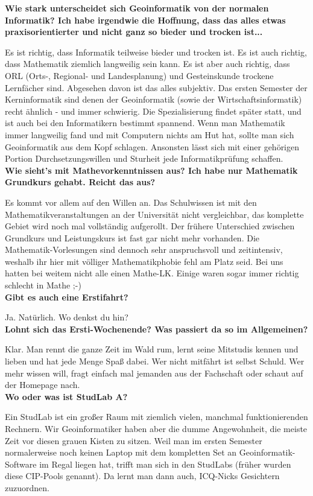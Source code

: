 \textbf{Wie stark unterscheidet sich Geoinformatik von der normalen Informatik? Ich habe irgendwie die Hoffnung, dass das alles etwas praxisorientierter und nicht ganz so bieder und trocken ist...}
 
Es ist richtig, dass Informatik teilweise bieder und trocken ist. Es ist auch richtig, dass Mathematik ziemlich langweilig sein kann. Es ist aber auch richtig, dass ORL (Orts-, Regional- und Landesplanung) und Gesteinskunde trockene Lernfächer sind. Abgesehen davon ist das alles subjektiv. Das ersten Semester der Kerninformatik sind denen der Geoinformatik (sowie der Wirtschaftsinformatik) recht ähnlich - und immer schwierig. Die Spezialisierung ﬁndet später statt, und ist auch bei den Informatikern bestimmt spannend. Wenn man Mathematik immer langweilig fand und mit Computern nichts am Hut hat, sollte man sich Geoinformatik aus dem Kopf schlagen. Ansonsten lässt sich mit einer gehörigen Portion Durchsetzungswillen und Sturheit jede Informatikprüfung schaffen.\\

\textbf{Wie sieht's mit Mathevorkenntnissen aus? Ich habe nur Mathematik Grundkurs gehabt. Reicht das aus?}

Es kommt vor allem auf den Willen an. Das Schulwissen ist mit den Mathematikveranstaltungen an der Universität nicht vergleichbar, das komplette Gebiet wird noch mal vollständig aufgerollt. Der frühere Unterschied zwischen Grundkurs und Leistungskurs ist fast gar nicht mehr vorhanden. Die Mathematik-Vorlesungen sind dennoch sehr anspruchsvoll und zeitintensiv, weshalb ihr hier mit völliger Mathematikphobie fehl am Platz seid. Bei uns hatten bei weitem nicht alle einen Mathe-LK. Einige waren sogar immer richtig schlecht in Mathe ;-)\\

\textbf{Gibt es auch eine Erstifahrt?}

Ja. Natürlich. Wo denkst du hin?\\

\textbf{Lohnt sich das Ersti-Wochenende? Was passiert da so im Allgemeinen?}

Klar. Man rennt die ganze Zeit im Wald rum, lernt seine Mitstudis kennen und lieben und hat jede Menge Spaß dabei. Wer nicht mitfährt ist selbst Schuld. Wer mehr wissen will, fragt einfach mal jemanden aus der Fachschaft oder schaut auf der Homepage nach.\\

\textbf{Wo oder was ist StudLab A?}

Ein StudLab ist ein großer Raum mit ziemlich vielen, manchmal funktionierenden Rechnern. Wir Geoinformatiker haben aber die dumme Angewohnheit, die meiste Zeit vor diesen grauen Kisten zu sitzen. Weil man im ersten Semester normalerweise noch keinen Laptop mit dem kompletten Set an Geoinformatik-Software im Regal liegen hat, trifft man sich in den StudLabs (früher wurden diese CIP-Pools genannt). Da lernt man dann auch, ICQ-Nicks Gesichtern zuzuordnen.

